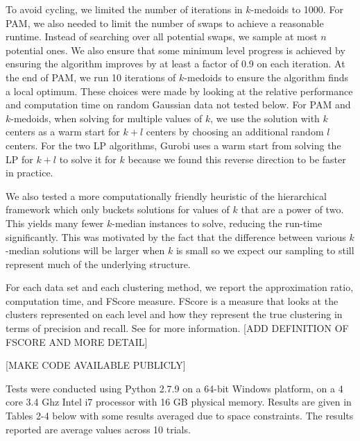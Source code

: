 \documentclass[conference, 10pt, final]{IEEEtran}
\begin{document}
To avoid cycling, we limited the number of iterations in $k$-medoids to 1000. For PAM, we also needed to limit the number of swaps to achieve a reasonable runtime. Instead of searching over all potential swaps, we sample at most $n$ potential ones. We also ensure that some minimum level progress is achieved by ensuring the algorithm improves by at least a factor of 0.9 on each iteration. At the end of PAM, we run 10 iterations of $k$-medoids to ensure the algorithm finds a local optimum. These choices were made by looking at the relative performance and computation time on random Gaussian data not tested below. For PAM and $k$-medoids, when solving for multiple values of $k$, we use the solution with $k$ centers as a warm start for $k+l$ centers by choosing an additional random $l$ centers. For the two LP algorithms, Gurobi uses a warm start from solving the LP for $k+l$ to solve it for $k$ because we found this reverse direction to be faster in practice. 

We also tested a more computationally friendly heuristic of the hierarchical framework which only buckets solutions for values of $k$ that are a power of two. This yields many fewer $k$-median instances to solve, reducing the run-time significantly. This was motivated by the fact that the difference between various $k$-median solutions will be larger when $k$ is small so we expect our sampling to still represent much of the underlying structure. 
 
For each data set and each clustering method, we report the approximation ratio, computation time, and FScore measure.  FScore is a measure that looks at the clusters represented on each level and how they represent the true clustering in terms of precision and recall. See \cite{Larsen} for more information. 
[ADD DEFINITION OF FSCORE AND MORE DETAIL]

[MAKE CODE AVAILABLE PUBLICLY]

Tests were conducted using Python 2.7.9 on a 64-bit Windows platform, on a 4 core 3.4 Ghz Intel i7 processor with 16 GB physical memory. Results are given in Tables 2-4  below with some results averaged due to space constraints. The results reported are average values across 10 trials.
\end{document}
